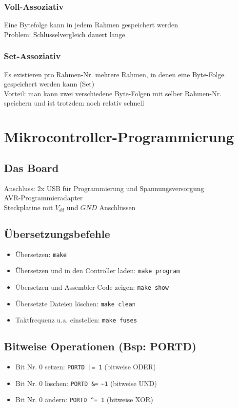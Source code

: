 \documentclass[german, threecolumn, 8pt]{latex4ei/latex4ei_sheet}
\begin{document}
\subsubsection{Voll-Assoziativ}
Eine Bytefolge kann in jedem Rahmen gespeichert werden \\
Problem: Schlüsselvergleich dauert lange
\subsubsection{Set-Assoziativ}
Es existieren pro Rahmen-Nr. mehrere Rahmen, in denen eine Byte-Folge gespeichert werden kann (Set) \\
Vorteil: man kann zwei verschiedene Byte-Folgen mit selber Rahmen-Nr. speichern und ist trotzdem noch relativ schnell

\section{Mikrocontroller-Programmierung}
\subsection{Das Board}
Anschluss: 2x USB für Programmierung und Spannungsversorgung \\
AVR-Programmieradapter \\
Steckplatine mit $V_{dd}$ und $GND$ Anschlüssen
\subsection{Übersetzungsbefehle}
\begin{itemize}\itemsep0pt
\item Übersetzen: \texttt{make}
\item Übersetzen und in den Controller laden: \texttt{make program}
\item Übersetzen und Assembler-Code zeigen: \texttt{make\ show}
\item Übersetzte Dateien löschen: \texttt{make clean}
\item Taktfrequenz u.a. einstellen: \texttt{make fuses}
\end{itemize}
\begin{minipage}{\columnwidth}
\subsection{Bitweise Operationen (Bsp: PORTD)}
\begin{itemize}\itemsep0pt
\item Bit Nr. 0 setzen: \texttt{PORTD |= 1} (bitweise ODER)
\item Bit Nr. 0 löschen: \texttt{PORTD \&=} \textasciitilde \texttt{1} (bitweise UND)
\item Bit Nr. 0 ändern: \texttt{PORTD \textasciicircum= 1} (bitweise XOR)
\end{itemize}
\end{minipage}
\end{document}
